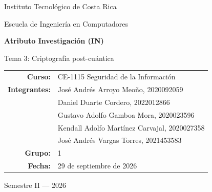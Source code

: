 \begin{titlepage}
\centering
\vspace*{2cm}
{\Large Instituto Tecnológico de Costa Rica\par}
\vspace{0.4cm}
{\large Escuela de Ingeniería en Computadores\par}
\vspace{2cm}
{\Large\bfseries Atributo Investigación (IN)\par}
\vspace{1cm}
{\large Tema 3: Criptografía post-cuántica\par}
\vfill
\begin{tabular}{rl}
\textbf{Curso:} & CE-1115 Seguridad de la Información \\
\textbf{Integrantes:} & José Andrés Arroyo Meoño, 2020092059 \\
 & Daniel Duarte Cordero, 2022012866 \\
 & Gustavo Adolfo Gamboa Mora, 2020023596 \\
 & Kendall Adolfo Martínez Carvajal, 2020027358 \\
 & José Andrés Vargas Torres, 2021453583 \\
\textbf{Grupo:} & 1 \\
\textbf{Fecha:} & 29 de septiembre de 2026
\end{tabular}
\vfill
{\large Semestre II — 2026\par}
\end{titlepage}
